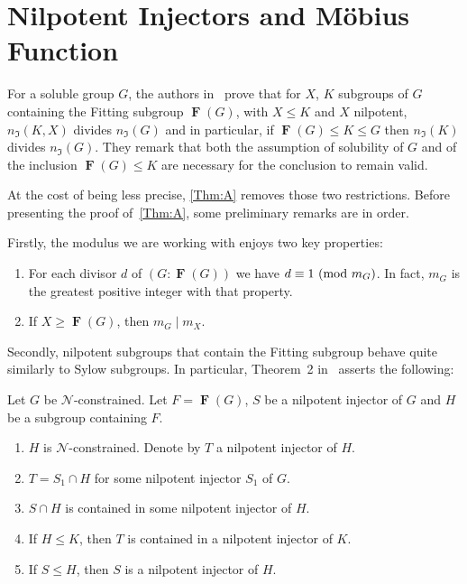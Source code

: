\documentclass[a4paper,12pt,reqno]{amsart}
\numberwithin{equation}{section}
\DeclareMathOperator{\fitt}{\mathbf{F}}
\renewcommand{\leq}{\leqslant}
\renewcommand{\geq}{\geqslant}
\newcommand{\md}[1]{\,\left(\textnormal{mod}\ #1\right)}
\begin{document}
\section{Nilpotent Injectors and M\"{o}bius Function}\label{Sec:2}

For a soluble group $G$, 
the authors in~\cite[Cor.~1.3]{arithmetical_questions} prove
that for $X$, $K$ subgroups of $G$
containing the Fitting subgroup $\fitt(G)$, with $X \leq K$ and $X$ nilpotent,
$n_\mathfrak{I}(K, X)$ divides $n_{\mathfrak{I}}(G)$
and in particular, if $\fitt(G) \leq K \leq G$ then
$n_{\mathfrak{I}}(K)$ divides $n_{\mathfrak{I}}(G)$.
They remark that both the assumption of solubility of $G$
and of the inclusion $\fitt(G) \leq K$ are necessary for
the conclusion to remain valid.

At the cost of being less precise,
\autoref{Thm:A} removes those two restrictions.
Before presenting the proof of~\autoref{Thm:A}, some preliminary remarks are in order.

Firstly, the modulus we are working with enjoys two key properties:
\begin{enumerate}[label={\upshape(\roman*)}]
\item\label{1} For each divisor $d$ of $(G : \fitt(G))$
we have $d \equiv 1 \md{m_G}$. 
In fact, $m_G$ is the greatest positive integer with that property.
\item\label{2} If $X \geq \fitt(G)$, then $m_G \mid m_X$.
\end{enumerate}

Secondly, nilpotent subgroups that contain the Fitting subgroup 
behave quite similarly to Sylow subgroups.
In particular, Theorem~2 in~\cite{mann_injectors} asserts the following:

Let $G$ be $\mathcal{N}$-constrained. 
Let $F = \fitt(G)$, $S$ be a nilpotent injector of $G$ 
and $H$ be a subgroup containing $F$.
\begin{enumerate}[label={\upshape(\alph*)}]
\item\label{alpha} $H$ is $\mathcal{N}$-constrained. 
Denote by $T$ a nilpotent injector of $H$.
\item\label{beta} $T = S_1 \cap H$ for some nilpotent injector $S_1$ of $G$.
\item\label{gamma} $S \cap H$ is contained in some nilpotent injector of $H$.
\item\label{delta} If $H \leq K$, then $T$ is contained in a nilpotent injector of $K$.
\item\label{epsilon} If $S \leq H$, then $S$ is a nilpotent injector of $H$.
\end{enumerate}
 
\end{document}
